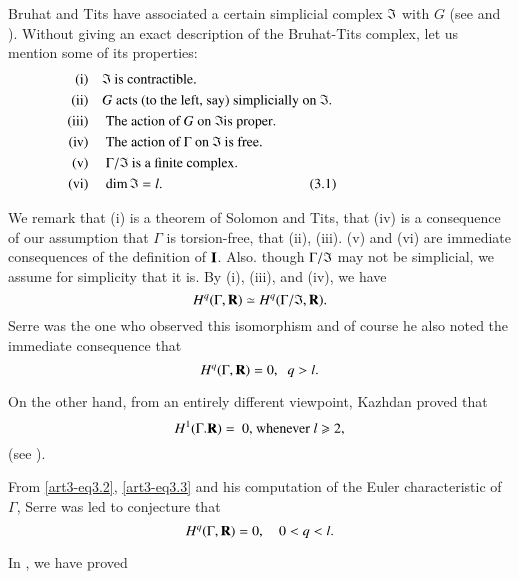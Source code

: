 Bruhat and Tits have associated a certain simplicial complex $\mathfrak{I}$ with $G$ (see \cite{art3-key2} and \cite{art3-key3}). Without giving an exact description of the Bruhat-Tits complex, let us mention some of its properties:
\begin{align*}
\text{(i)} &\quad \fI \text{ is contractible.} \hspace{3cm}\\
\text{(ii)} &\quad G \text{ acts (to the left, say) simplicially on } \fI.  \hspace{3cm}\\
\text{(iii)} &\quad \text{ The action of } G \text{ on } \fI \text{is proper}.  \hspace{3cm}\\
\text{(iv)} &\quad \text{ The action of $\Gamma$ on $\fI$ is free.}  \hspace{3cm}\\
\text{(v)} &\quad \text{ $\Gamma/\fI$ is a finite complex.}  \hspace{3cm}\\
\text{(vi)} &\quad \text{ $\dim \fI = l$.}  \hspace{3cm} \tag{3.1}
\end{align*}

We remark that (i) is a theorem of Solomon and Tits, that (iv) is a consequence of our assumption that $\Gamma$ is torsion-free, that (ii), (iii). (v) and (vi) are immediate consequences of the definition of $\mathbf{I}$. Also. though $\Gamma/\mathfrak{I}$ may not be simplicial, we assume for simplicity that it is. By (i), (iii), and (iv), we have
$$
H^q (\Gamma, \mathbf{R}) \simeq H^q (\Gamma/\mathfrak{I}, \mathbf{R}).
$$
Serre was the one who observed this isomorphism and of course he also noted the immediate consequence that 
\begin{equation}
H^q (\Gamma, \mathbf{R}) = 0, \;\; q>l. \label{art3-eq3.2}
\end{equation}

On the other hand, from an entirely different viewpoint, Kazhdan proved that
\begin{equation}
H^1 (\Gamma. \mathbf{R}) = \text{ 0, whenever $l \geqslant 2$,}
\label{art3-eq3.3}
\end{equation}
(see \cite{art3-key5}).

From \eqref{art3-eq3.2}, \eqref{art3-eq3.3} and his computation of the Euler characteristic of $\Gamma$, Serre was led to conjecture that 
$$
H^q (\Gamma, \mathbf{R}) = 0, \quad 0 < q < l.
$$

In \cite{art3-key7}, we have proved

